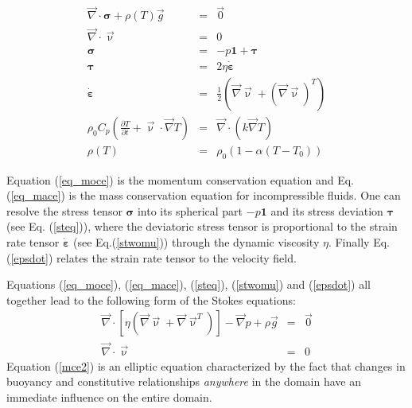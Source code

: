 \begin{eqnarray}
{\vec \nabla}\cdot {\bm \sigma} + \rho(T) {\vec g} &=& {\vec 0} \label{eq_moce}\\
{\vec \nabla}\cdot {\vec \upnu} &=& 0 \label{eq_mace}\\
{\bm \sigma} &=& -p {\bm 1} + {\bm \tau} \label{steq}\\
{\bm \tau} &=& 2 \eta \dot{\bm \varepsilon} \label{stwomu}\\
\dot{\bm \varepsilon}  &=& \frac{1}{2} \left( {\vec \nabla}{\vec \upnu} 
+ ({\vec \nabla}{\vec \upnu})^T  \right) \label{epsdot} \\
\rho_0 C_p \left( \frac{\partial T}{\partial t}  + {\vec \upnu}\cdot {\vec \nabla} T\right) 
&=& {\vec \nabla}\cdot (k {\vec \nabla}T)  \label{eqhte} \\
\rho(T) &=& \rho_0 (1 - \alpha (T-T_0)) 
\end{eqnarray}

Equation (\ref{eq_moce}) is the momentum conservation equation and 
Eq. (\ref{eq_mace}) is the mass conservation equation for incompressible fluids.
One can resolve the stress tensor ${\bm \sigma}$ into its spherical part $-p{\bm 1}$ and 
its stress deviation ${\bm \tau}$ (see Eq. (\ref{steq})), where the deviatoric stress tensor is 
proportional to the strain rate tensor $\dot{\bm \varepsilon}$ (see Eq.(\ref{stwomu})) through the 
dynamic viscosity $\eta$. 
Finally Eq. (\ref{epsdot}) relates the strain rate tensor to the velocity field.

Equations (\ref{eq_moce}), (\ref{eq_mace}), (\ref{steq}), (\ref{stwomu}) and (\ref{epsdot}) all 
together lead to the following form of the Stokes equations:
\begin{eqnarray}
{\vec \nabla}\cdot [\eta ({\vec\nabla} {\vec \upnu} + {\vec \nabla} {\vec \upnu}^T ) ] 
- {\vec \nabla}p + \rho {\vec g} &=& {\vec 0} \label{mce2} \\
{\vec \nabla}\cdot {\vec \upnu} &=& 0 \label{eq_mace2}
\end{eqnarray}
Equation (\ref{mce2}) is an elliptic equation characterized by the 
fact that changes in buoyancy and constitutive relationships {\it anywhere} 
in the domain have an immediate influence on the entire domain.

